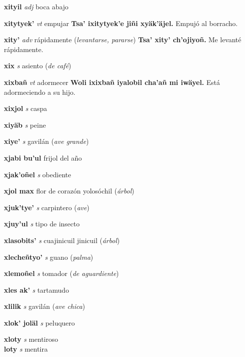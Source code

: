 \documentclass[10pt]{scrbook}
\newcommand{\entry}[1]{\textbf{#1}}
\newcommand{\partofspeech}[1]{\textit{#1}}
\newcommand{\spanishtranslation}[1]{#1}
\newcommand{\clarification}[1]{(\textit{#1})}
\newcommand{\cholexample}[1]{\textbf{#1}}
\newcommand{\exampletranslation}[1]{#1}
\newcommand{\secondaryentry}[1]{\\\textbf{#1}}
\newcommand{\secondpartofspeech}[1]{\textit{#1}}
\newcommand{\secondtranslation}[1]{#1}
\begin{document}
\begin{multicols}{2}
\entry{xityil}
\partofspeech{adj}
\spanishtranslation{boca abajo}

\entry{xitytyek'}
\partofspeech{vt}
\spanishtranslation{empujar}
\cholexample{Tsa' ixitytyek'e jiñi xyäk'äjel.}
\exampletranslation{Empujó al borracho.}

\entry{xity'}
\partofspeech{adv}
\spanishtranslation{rápidamente}
\clarification{levantarse, pararse}
\cholexample{Tsa' xity' ch'ojiyoñ.}
\exampletranslation{Me levanté rápidamente.}

\entry{xix}
\partofspeech{s}
\spanishtranslation{asiento}
\clarification{de café}

\entry{xixbañ}
\partofspeech{vt}
\spanishtranslation{adormecer}
\cholexample{Woli ixixbañ iyalobil cha'añ mi iwäyel.}
\exampletranslation{Está adormeciendo a su hijo.}

\entry{xixjol}
\partofspeech{s}
\spanishtranslation{caspa}

\entry{xiyäb}
\partofspeech{s}
\spanishtranslation{peine}

\entry{xiye'}
\partofspeech{s}
\spanishtranslation{gavilán}
\clarification{ave grande}

\entry{xjabi bu'ul}
\spanishtranslation{frijol del año}

\entry{xjak'oñel}
\partofspeech{s}
\spanishtranslation{obediente}

\entry{xjol max}
\spanishtranslation{flor de corazón}
\spanishtranslation{yolosóchil}
\clarification{árbol}

\entry{xjuk'tye'}
\partofspeech{s}
\spanishtranslation{carpintero}
\clarification{ave}

\entry{xjuy'ul}
\partofspeech{s}
\spanishtranslation{tipo de insecto}

\entry{xlasobits'}
\partofspeech{s}
\spanishtranslation{cuajinicuil}
\spanishtranslation{jinicuil}
\clarification{árbol}

\entry{xlecheñtyo'}
\partofspeech{s}
\spanishtranslation{guano}
\clarification{palma}

\entry{xlemoñel}
\partofspeech{s}
\spanishtranslation{tomador}
\clarification{de aguardiente}

\entry{xles ak'}
\partofspeech{s}
\spanishtranslation{tartamudo}

\entry{xlilik}
\partofspeech{s}
\spanishtranslation{gavilán}
\clarification{ave chica}

\entry{xlok' joläl}
\partofspeech{s}
\spanishtranslation{peluquero}

\entry{xloty}
\partofspeech{s}
\spanishtranslation{mentiroso}
\secondaryentry{loty}
\secondpartofspeech{s}
\secondtranslation{mentira}


\end{multicols}
\end{document}
